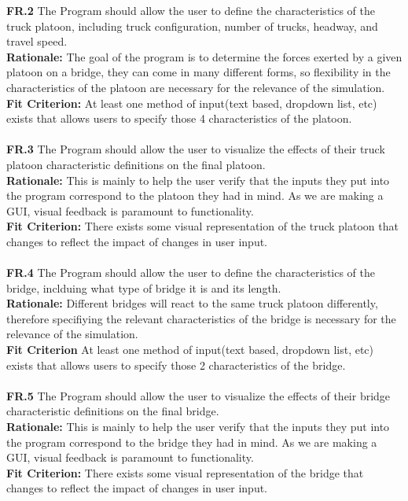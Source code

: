 \documentclass[12pt]{article}
\begin{document}
  
  \textbf{FR.2} The Program should allow the user to define the characteristics of the truck platoon, including truck configuration, number of trucks, headway, and travel speed.\\
  \textbf{Rationale:} The goal of the program is to determine the forces exerted by a given platoon on a bridge, they can come in many different forms, so flexibility in the characteristics
  of the platoon are necessary for the relevance of the simulation.\\ 
  \textbf{Fit Criterion:} At least one method of input(text based, dropdown list, etc) exists that allows users to specify those 4 characteristics of the platoon.\\\\

  \textbf{FR.3} The Program should allow the user to visualize the effects of their truck platoon characteristic definitions on the final platoon.\\
  \textbf{Rationale:} This is mainly to help the user verify that the inputs they put into the program correspond to the platoon they had in mind. As we are making a GUI,
  visual feedback is paramount to functionality.\\
  \textbf{Fit Criterion:} There exists some visual representation of the truck platoon that changes to reflect the impact of changes in user input.\\\\

  \textbf{FR.4} The Program should allow the user to define the characteristics of the bridge, inclduing what type of bridge it is and its length.\\
  \textbf{Rationale:} Different bridges will react to the same truck platoon differently, therefore specifiying the relevant characteristics of the bridge is necessary for
  the relevance of the simulation.\\
  \textbf{Fit Criterion} At least one method of input(text based, dropdown list, etc) exists that allows users to specify those 2 characteristics of the bridge.\\\\
  
  \textbf{FR.5} The Program should allow the user to visualize the effects of their bridge characteristic definitions on the final bridge.\\
  \textbf{Rationale:} This is mainly to help the user verify that the inputs they put into the program correspond to the bridge they had in mind. As we are making a GUI,
  visual feedback is paramount to functionality.\\
  \textbf{Fit Criterion:} There exists some visual representation of the bridge that changes to reflect the impact of changes in user input.\\\\ 
\end{document}
